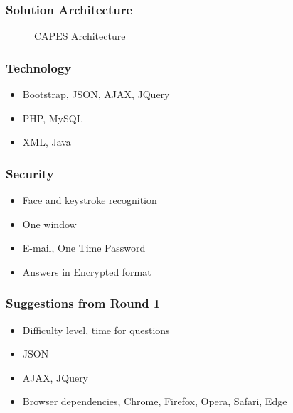 \documentclass[17pt]{beamer}
\begin{document}
\begin{frame}
\frametitle{Solution Architecture} \pause


 \begin{figure}[H]
	  \centering
	  \caption{CAPES Architecture}
  \end{figure}

\end{frame}


\begin{frame}

\frametitle{Technology} \pause

\begin{itemize}
[<+-|alert@+>]
\item Bootstrap, JSON, AJAX, JQuery
\item PHP, MySQL
\item XML, Java
\end{itemize}
\end{frame}

\begin{frame}
\frametitle{Security} \pause
\begin{itemize}[<+-|alert@+>]
\item Face and keystroke recognition
\item One window
\item E-mail, One Time Password
\item Answers in Encrypted format
\end{itemize}
\end{frame}


\begin{frame}
\frametitle{Suggestions from Round 1} \pause
\begin{itemize}[<+-|alert@+>]
\item Difficulty level, time for questions
\item JSON
\item AJAX, JQuery
\item Browser dependencies, Chrome, Firefox, Opera, Safari, Edge
\end{itemize}
\end{frame}
\end{document}
